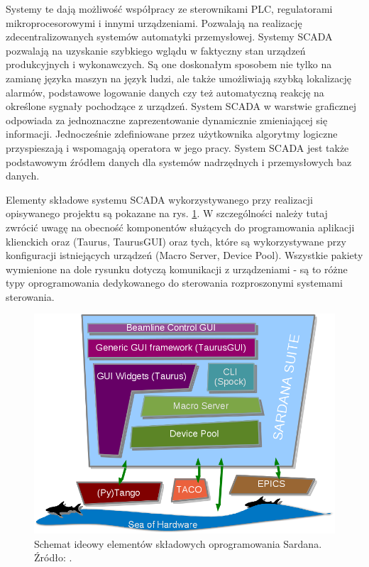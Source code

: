 	\hspace{2em}Systemy te dają możliwość współpracy ze sterownikami PLC, regulatorami mikroprocesorowymi i innymi urządzeniami. Pozwalają na realizację zdecentralizowanych systemów automatyki przemysłowej. Systemy SCADA pozwalają na uzyskanie szybkiego wglądu w faktyczny stan urządzeń produkcyjnych i wykonawczych. Są one doskonałym sposobem nie tylko na zamianę języka maszyn na język ludzi, ale także umożliwiają szybką lokalizację alarmów, podstawowe logowanie danych czy też automatyczną reakcję na określone sygnały pochodzące z urządzeń. System SCADA w warstwie graficznej odpowiada za jednoznaczne zaprezentowanie dynamicznie zmieniającej się informacji. Jednocześnie zdefiniowane przez użytkownika algorytmy logiczne przyspieszają i wspomagają operatora w jego pracy. System SCADA jest także podstawowym źródłem danych dla systemów nadrzędnych i przemysłowych baz danych.
	
	\hspace{2em}Elementy składowe systemu SCADA wykorzystywanego przy realizacji opisywanego projektu są pokazane na rys. \ref{fig:sardana-outline}. W szczególności należy tutaj zwrócić uwagę na obecność komponentów służących do programowania aplikacji klienckich oraz (Taurus, TaurusGUI) oraz tych, które są wykorzystywane przy konfiguracji istniejących urządzeń (Macro Server, Device Pool). Wszystkie pakiety wymienione na dole rysunku dotyczą komunikacji z urządzeniami - są to różne typy oprogramowania dedykowanego do sterowania rozproszonymi systemami sterowania.
	
	\begin{figure}[pth]
		\centering
		\includegraphics[width=1\linewidth]{Grafika/sardana_sketch}
		\caption{Schemat ideowy elementów składowych oprogramowania Sardana. Źródło: \cite{Sardana}.}
		\label{fig:sardana-outline}
	\end{figure}
	

